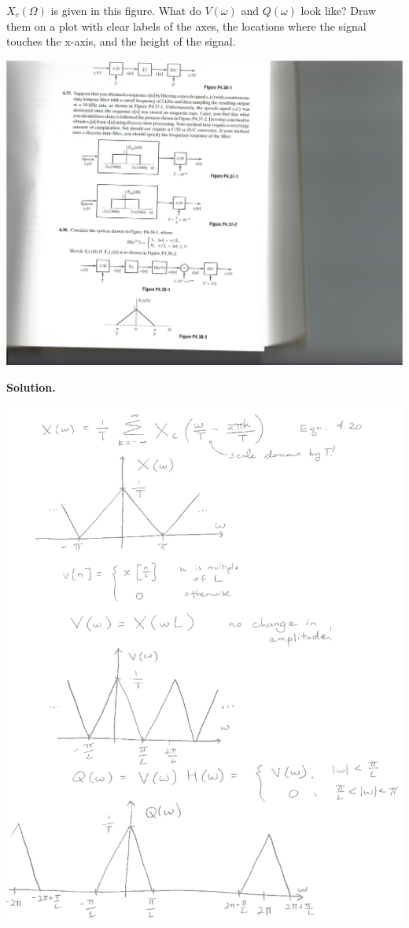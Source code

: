 \documentclass[]{siamltex}
\begin{document}
\begin{enumerate}
\begin{enumerate}
$X_c(\Omega)$ is given in this figure. What do $V(\omega)$ and $Q(\omega)$ look like? Draw them on a plot with clear labels of the axes, the locations where the signal touches the x-axis, and the height of the signal.

\includegraphics{osb4382}

\textbf{Solution.}

\includegraphics[height = 0.5\textheight]{5a.png} 


\end{enumerate}
\end{enumerate}
\end{document}
